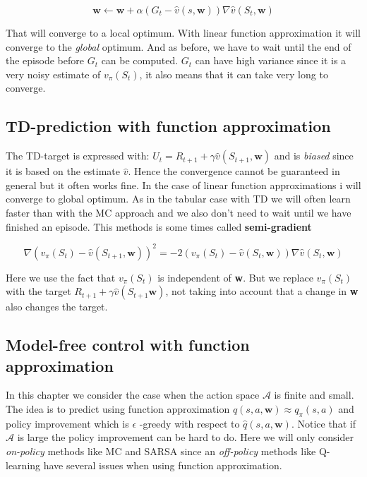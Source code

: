 	\begin{equation}
		\textbf{w} \leftarrow \textbf{w} + \alpha (G_t - \hat{v}(s, \textbf{w}))\nabla \hat{v}(S_t, \textbf{w})
	\end{equation} 

That will converge to a local optimum. With linear function approximation it will converge to the \emph{global} optimum. And as before, we have to wait until the end of the episode before $G_t$ can be computed. $G_t$ can have high variance since it is a very noisy estimate of $v_\pi(S_t)$, it also means that it can take very long to converge.

\subsection{TD-prediction with function approximation}
The TD-target is expressed with: $U_t = R_{t+1} + \gamma \hat{v}(S_{t+1}, \textbf{w})$ and is \emph{biased} since it is based on the estimate $\hat{v}$. Hence the convergence cannot be guaranteed in general but it often works fine. In the case of linear function approximations i will converge to global optimum. As in the tabular case with TD we will often learn faster than with the MC approach and we also don't need to wait until we have finished an episode. This methods is some times called \textbf{semi-gradient}

	\begin{equation}
		\nabla (v_\pi(S_t) - \hat{v}(S_{t+1},\textbf{w}))^{2} = -2 (v_\pi(S_t) - \hat{v}(S_t, \textbf{w}))\nabla \hat{v}(S_t,\textbf{w})
	\end{equation}

Here we use the fact that $v_\pi(S_t)$ is independent of \textbf{w}. But we replace $v_\pi(S_t)$ with the target $R_{t+1} + \gamma \hat{v}(S_{t+1} \textbf{w})$, not taking into account that a change in \textbf{w} also changes the target.

\subsection{Model-free control with function approximation}
In this chapter we consider the case when the action space $\mathcal{A}$ is finite and small. The idea is to predict using function approximation $\hat{q}(s,a,\textbf{w}) \approx q_\pi(s,a)$ and policy improvement which is $\epsilon$ 
-greedy with respect to $\hat{q}(s,a,\textbf{w})$. Notice that if $\mathcal{A}$ is large the policy improvement can be hard to do. Here we will only consider \emph{on-policy} methods like MC and SARSA since an \emph{off-policy} methods like Q-learning have several issues when using function approximation.

